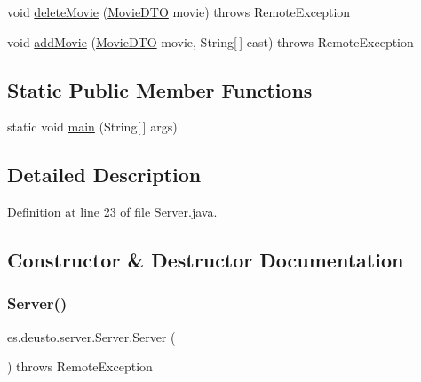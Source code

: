\begin{DoxyCompactItemize}
\item 
void \mbox{\hyperlink{classes_1_1deusto_1_1server_1_1_server_a9821a6a51f378535746f26fde396ade5}{delete\+Movie}} (\mbox{\hyperlink{classes_1_1deusto_1_1server_1_1data_1_1_movie_d_t_o}{Movie\+D\+TO}} movie)  throws Remote\+Exception 
\item 
void \mbox{\hyperlink{classes_1_1deusto_1_1server_1_1_server_ac5b894308dff2d0d47b7c665f190603c}{add\+Movie}} (\mbox{\hyperlink{classes_1_1deusto_1_1server_1_1data_1_1_movie_d_t_o}{Movie\+D\+TO}} movie, String\mbox{[}$\,$\mbox{]} cast)  throws Remote\+Exception 
\end{DoxyCompactItemize}
\subsection*{Static Public Member Functions}
\begin{DoxyCompactItemize}
\item 
static void \mbox{\hyperlink{classes_1_1deusto_1_1server_1_1_server_a750bb0d7dbd89246a3602f2e20d03fb5}{main}} (String\mbox{[}$\,$\mbox{]} args)
\end{DoxyCompactItemize}


\subsection{Detailed Description}


Definition at line 23 of file Server.\+java.



\subsection{Constructor \& Destructor Documentation}
\mbox{\label{classes_1_1deusto_1_1server_1_1_server_a84f78162a65dd737f224eb2f94c43023}} 
\subsubsection{\texorpdfstring{Server()}{Server()}}
{\footnotesize\ttfamily es.\+deusto.\+server.\+Server.\+Server (\begin{DoxyParamCaption}{ }\end{DoxyParamCaption}) throws Remote\+Exception}



